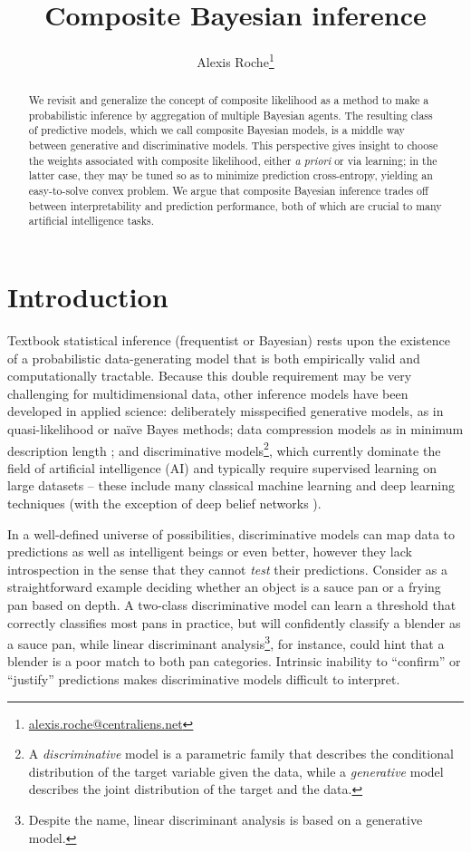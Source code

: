 \documentclass[english]{scrartcl}
\title{Composite Bayesian inference}
\author{Alexis Roche\thanks{\url{alexis.roche@centraliens.net}}}
\begin{document}
\maketitle

\begin{abstract}
We revisit and generalize the concept of composite likelihood as a method to make a probabilistic inference by aggregation of multiple Bayesian agents. The resulting class of predictive models, which we call composite Bayesian models, is a middle way between generative and discriminative models. This perspective gives insight to choose the weights associated with composite likelihood, either {\em a priori} or via learning; in the latter case, they may be tuned so as to minimize prediction cross-entropy, yielding an easy-to-solve convex problem. We argue that composite Bayesian inference trades off between interpretability and prediction performance, both of which are crucial to many artificial intelligence tasks.
\end{abstract}


\section{Introduction}
\label{sec:intro}

Textbook statistical inference (frequentist or Bayesian) rests upon the existence of a probabilistic data-generating model that is both empirically valid and computationally tractable. Because this double requirement may be very challenging for multidimensional data, other inference models have been developed in applied science: deliberately misspecified generative models, as in quasi-likelihood \cite{White-82,Walker-13} or na\"ive Bayes \cite{Ng-01} methods; data compression models as in minimum description length \cite{Grunwald-07}; and discriminative models\footnote{A {\em discriminative} model is a parametric family that describes the conditional distribution of the target variable given the data, while a {\em generative} model describes the joint distribution of the target and the data.}, which currently dominate the field of artificial intelligence (AI) and typically require supervised learning on large datasets -- these include many classical machine learning \cite{Ho-95,BergerA-96,Vapnik-00,Rasmussen-06} and deep learning \cite{Lecun-15,Goodfellow-16} techniques (with the exception of deep belief networks \cite{Hinton-06}).

In a well-defined universe of possibilities, discriminative models can map data to predictions as well as intelligent beings or even better, however they lack introspection in the sense that they cannot {\em test} their predictions. Consider as a straightforward example deciding whether an object is a sauce pan or a frying pan based on depth. A two-class discriminative model can learn a threshold that correctly classifies most pans in practice, but will confidently classify a blender as a sauce pan, while linear discriminant analysis\footnote{Despite the name, linear discriminant analysis is based on a generative model.}, for instance, could hint that a blender is a poor match to both pan categories. Intrinsic inability to ``confirm'' or ``justify'' predictions makes discriminative models difficult to interpret.
\end{document}
